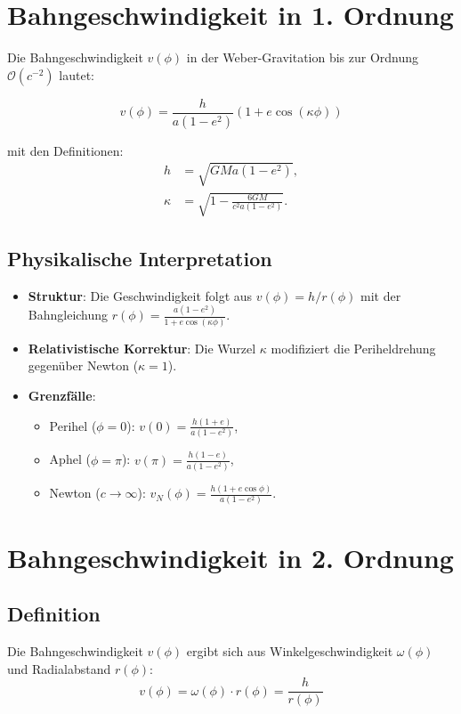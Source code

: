 \newpage
\section{Bahngeschwindigkeit in 1. Ordnung}
Die Bahngeschwindigkeit \(v(\phi)\) in der Weber-Gravitation bis zur Ordnung \(\mathcal{O}(c^{-2})\) lautet:

\begin{equation}
v(\phi) = \frac{h}{a(1 - e^2)} \left(1 + e \cos\left(\kappa\phi\right)\right)
\end{equation}

\noindent mit den Definitionen:
\begin{align*}
h &= \sqrt{GMa(1 - e^2)}, \\
\kappa &= \sqrt{1 - \frac{6GM}{c^2a(1 - e^2)}}.
\end{align*}

\subsection*{Physikalische Interpretation}
\begin{itemize}
    \item \textbf{Struktur}: Die Geschwindigkeit folgt aus \(v(\phi) = h/r(\phi)\) mit der Bahngleichung \(r(\phi) = \frac{a(1 - e^2)}{1 + e \cos(\kappa\phi)}\).
    \item \textbf{Relativistische Korrektur}: Die Wurzel \(\kappa\) modifiziert die Periheldrehung gegenüber Newton (\(\kappa = 1\)).
    \item \textbf{Grenzfälle}:
        \begin{itemize}
            \item Perihel (\(\phi = 0\)): \(v(0) = \frac{h(1 + e)}{a(1 - e^2)}\),
            \item Aphel (\(\phi = \pi\)): \(v(\pi) = \frac{h(1 - e)}{a(1 - e^2)}\),
            \item Newton (\(c \to \infty\)): \(v_N(\phi) = \frac{h(1 + e \cos\phi)}{a(1 - e^2)}\).
        \end{itemize}
\end{itemize}

\section{Bahngeschwindigkeit in 2. Ordnung}
\subsection*{Definition}
Die Bahngeschwindigkeit $v(\phi)$ ergibt sich aus Winkelgeschwindigkeit $\omega(\phi)$ und Radialabstand $r(\phi)$:
\begin{equation}
v(\phi) = \omega(\phi) \cdot r(\phi) = \frac{h}{r(\phi)}
\end{equation}

